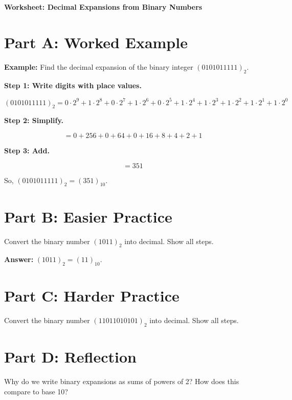 \documentclass[12pt]{article}
\begin{document}
\begin{center}
\Large\textbf{Worksheet: Decimal Expansions from Binary Numbers}
\end{center}

\section*{Part A: Worked Example}

\textbf{Example:} Find the decimal expansion of the binary integer $(0101011111)_2$.

\textbf{Step 1: Write digits with place values.}

\[
(0101011111)_2 = 0 \cdot 2^9 + 1 \cdot 2^8 + 0 \cdot 2^7 + 1 \cdot 2^6 + 0 \cdot 2^5 
+ 1 \cdot 2^4 + 1 \cdot 2^3 + 1 \cdot 2^2 + 1 \cdot 2^1 + 1 \cdot 2^0
\]

\textbf{Step 2: Simplify.}

\[
= 0 + 256 + 0 + 64 + 0 + 16 + 8 + 4 + 2 + 1
\]

\textbf{Step 3: Add.}

\[
= 351
\]

So, $(0101011111)_2 = (351)_{10}$.

\section*{Part B: Easier Practice}

Convert the binary number $(1011)_2$ into decimal. Show all steps.

\vspace{3cm} %

\textbf{Answer:} $(1011)_2 = (11)_{10}$.

\section*{Part C: Harder Practice}

Convert the binary number $(11011010101)_2$ into decimal. Show all steps.

\vspace{4cm} %

\section*{Part D: Reflection}

Why do we write binary expansions as sums of powers of 2? 
How does this compare to base 10?

\vspace{2cm}
\end{document}

